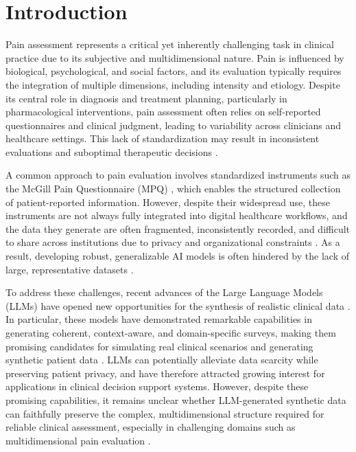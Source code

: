 \documentclass[preprint,12pt,authoryear]{elsarticle}
\begin{document}


\section{Introduction}

Pain assessment represents a critical yet inherently challenging task in clinical practice due to its subjective and multidimensional nature. Pain is influenced by biological, psychological, and social factors, and its evaluation typically requires the integration of multiple dimensions, including intensity and etiology. Despite its central role in diagnosis and treatment planning, particularly in pharmacological interventions, pain assessment often relies on self-reported questionnaires and clinical judgment, leading to variability across clinicians and healthcare settings. This lack of standardization may result in inconsistent evaluations and suboptimal therapeutic decisions \citep{fillingim2016assessment, khan2024cracking}.

A common approach to pain evaluation involves standardized instruments such as the McGill Pain Questionnaire (MPQ) \citep{melzack1975mcgill}, which enables the structured collection of patient-reported information. However, despite their widespread use, these instruments are not always fully integrated into digital healthcare workflows, and the data they generate are often fragmented, inconsistently recorded, and difficult to share across institutions due to privacy and organizational constraints \citep{nowrozy2024privacy, PATI2024100974}. As a result, developing robust, generalizable AI models is often hindered by the lack of large, representative datasets \citep{yang2022federated}.

To address these challenges, recent advances of the Large Language  Models (LLMs) have opened new opportunities for the synthesis of realistic clinical data \citep{rujas2025synthetic}. In particular, these models have demonstrated remarkable capabilities in generating coherent, context-aware, and domain-specific surveys, making them promising candidates for simulating real clinical scenarios and generating synthetic patient data \citep{openai2023gpt4, singhal2023medpalm2}. LLMs can potentially alleviate data scarcity while preserving patient privacy, and have therefore attracted growing interest for applications in clinical decision support systems. However, despite these promising capabilities, it remains unclear whether LLM-generated synthetic data can faithfully preserve the complex, multidimensional structure required for reliable clinical assessment, especially in challenging domains such as multidimensional pain evaluation \citep{fillingim2016assessment, khan2024cracking}.
\end{document}
